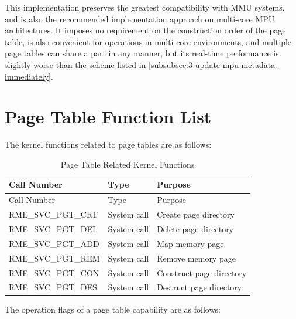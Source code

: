 This implementation preserves the greatest compatibility with MMU systems, and is also the recommended implementation approach on multi-core MPU architectures. It imposes no requirement on the construction order of the page table, is also convenient for operations in multi-core environments, and multiple page tables can share a part in any manner, but its real-time performance is slightly worse than the scheme listed in \ref{subsubsec:3-update-mpu-metadata-immediately}.

\section{Page Table Function List}\label{sec:3-page-table-function-list}
\nopagebreak[4]

The kernel functions related to page tables are as follows:

\begin{xltabular}{\textwidth}{@{}>{\hsize\raggedright\arraybackslash}X>{\hsize\raggedright\arraybackslash}X>{\hsize\raggedright\arraybackslash}X@{}}
\caption{Page Table Related Kernel Functions}\label{tab:3-8-page-table-related-kernel-functions}\\
\toprule
Call Number & Type & Purpose\tabularnewline
\endfirsthead
\toprule
Call Number & Type & Purpose\tabularnewline
\midrule
\endhead
\bottomrule
\endlastfoot
RME\_SVC\_PGT\_CRT & System call & Create page directory\tabularnewline
RME\_SVC\_PGT\_DEL & System call & Delete page directory\tabularnewline
RME\_SVC\_PGT\_ADD & System call & Map memory page\tabularnewline
RME\_SVC\_PGT\_REM & System call & Remove memory page\tabularnewline
RME\_SVC\_PGT\_CON & System call & Construct page directory\tabularnewline
RME\_SVC\_PGT\_DES & System call & Destruct page directory\tabularnewline
\end{xltabular}
\nopagebreak[4]

The operation flags of a page table capability are as follows:

